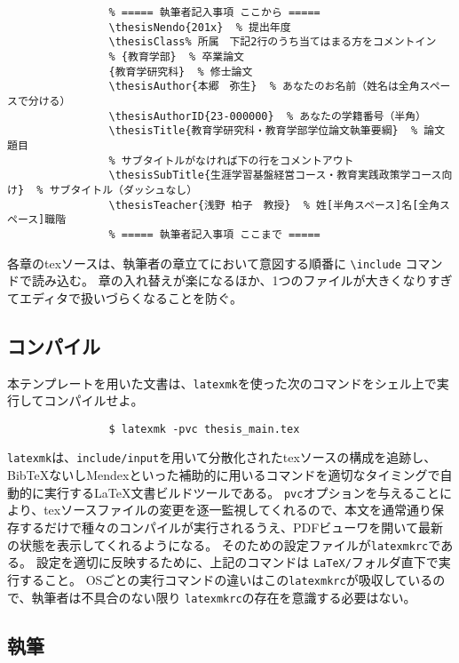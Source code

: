 			\begin{verbatim}
				% ===== 執筆者記入事項 ここから =====
				\thesisNendo{201x}  % 提出年度
				\thesisClass% 所属　下記2行のうち当てはまる方をコメントイン
				% {教育学部}  % 卒業論文
				{教育学研究科}  % 修士論文
				\thesisAuthor{本郷　弥生}  % あなたのお名前（姓名は全角スペースで分ける）
				\thesisAuthorID{23-000000}  % あなたの学籍番号（半角）
				\thesisTitle{教育学研究科・教育学部学位論文執筆要綱}  % 論文題目
				% サブタイトルがなければ下の行をコメントアウト
				\thesisSubTitle{生涯学習基盤経営コース・教育実践政策学コース向け}  % サブタイトル（ダッシュなし）
				\thesisTeacher{浅野 柏子　教授}  % 姓[半角スペース]名[全角スペース]職階
				% ===== 執筆者記入事項 ここまで =====
			\end{verbatim}

			各章のtexソースは、執筆者の章立てにおいて意図する順番に \texttt{\textbackslash include} コマンドで読み込む。
			章の入れ替えが楽になるほか、1つのファイルが大きくなりすぎてエディタで扱いづらくなることを防ぐ。

		\subsection{コンパイル}
			\label{sub:compile}

			本テンプレートを用いた文書は、\texttt{latexmk}を使った次のコマンドをシェル上で実行してコンパイルせよ。

			\begin{verbatim}
				$ latexmk -pvc thesis_main.tex
			\end{verbatim}

			\texttt{latexmk}は、\texttt{include/input}を用いて分散化されたtexソースの構成を追跡し、BibTeXないしMendexといった補助的に用いるコマンドを適切なタイミングで自動的に実行する\LaTeX 文書ビルドツールである。
			\texttt{pvc}オプションを与えることにより、texソースファイルの変更を逐一監視してくれるので、本文を通常通り保存するだけで種々のコンパイルが実行されるうえ、PDFビューワを開いて最新の状態を表示してくれるようになる。
			そのための設定ファイルが\texttt{latexmkrc}である。
			設定を適切に反映するために、上記のコマンドは \texttt{LaTeX/}フォルダ直下で実行すること。
			OSごとの実行コマンドの違いはこの\texttt{latexmkrc}が吸収しているので、執筆者は不具合のない限り \texttt{latexmkrc}の存在を意識する必要はない。

		\subsection{執筆}
		  \label{sub:writing}


